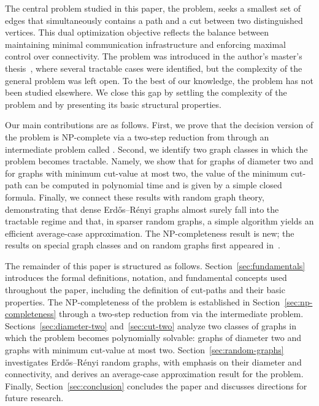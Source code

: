 The central problem studied in this paper, the \MinCutPath{} problem, seeks a smallest set of edges that simultaneously contains a path and a cut between two distinguished vertices.
This dual optimization objective reflects the balance between maintaining minimal communication infrastructure and enforcing maximal control over connectivity.
The problem was introduced in the author's master's thesis~\cite{Michel2025MinCutPath}, where several tractable cases were identified, but the complexity of the general problem was left open.
To the best of our knowledge, the problem has not been studied elsewhere.
We close this gap by settling the complexity of the problem and by presenting its basic structural properties.

Our main contributions are as follows.
First, we prove that the decision version of the \MinCutPath{} problem is NP-complete via a two-step reduction from \ThreeSAT{} through an intermediate problem called \SSP.
Second, we identify two graph classes in which the problem becomes tractable.
Namely, we show that for graphs of diameter two and for graphs with minimum cut-value at most two, the value of the minimum cut-path can be computed in polynomial time and is given by a simple closed formula.
Finally, we connect these results with random graph theory, demonstrating that dense Erdős–Rényi graphs almost surely fall into the tractable regime and that, in sparser random graphs, a simple algorithm yields an efficient average-case approximation.
The NP-completeness result is new; the results on special graph classes and on random graphs first appeared in~\cite{Michel2025MinCutPath}.

The remainder of this paper is structured as follows.
Section~\ref{sec:fundamentals} introduces the formal definitions, notation, and fundamental concepts used throughout the paper, including the definition of cut-paths and their basic properties.
The NP-completeness of the \MinCutPath{} problem is established in Section~\ref{sec:np-completeness} through a two-step reduction from \ThreeSAT{} via the intermediate \SSP{} problem.
Sections~\ref{sec:diameter-two} and~\ref{sec:cut-two} analyze two classes of graphs in which the problem becomes polynomially solvable: graphs of diameter two and graphs with minimum cut-value at most two.
Section~\ref{sec:random-graphs} investigates Erdős–Rényi random graphs, with emphasis on their diameter and connectivity, and derives an average-case approximation result for the \MinCutPath{} problem.
Finally, Section~\ref{sec:conclusion} concludes the paper and discusses directions for future research.

